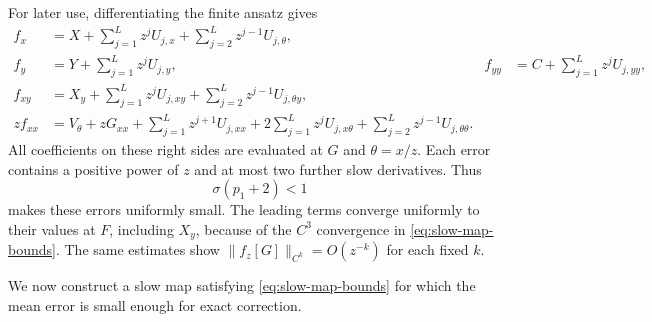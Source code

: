 For later use, differentiating the finite ansatz gives
\begin{align*}
 f_x&=X+\sum_{j=1}^L z^jU_{j,x}
           +\sum_{j=2}^L z^{j-1}U_{j,\theta},\\
 f_y&=Y+\sum_{j=1}^L z^jU_{j,y},
 &f_{yy}&=C+\sum_{j=1}^L z^jU_{j,yy},\\
 f_{xy}&=X_y+\sum_{j=1}^L z^jU_{j,xy}
           +\sum_{j=2}^L z^{j-1}U_{j,\theta y},\\
 zf_{xx}&=V_\theta+zG_{xx}
       +\sum_{j=1}^L z^{j+1}U_{j,xx}
       +2\sum_{j=1}^L z^jU_{j,x\theta}
       +\sum_{j=2}^L z^{j-1}U_{j,\theta\theta}.
\end{align*}
All coefficients on these right sides are evaluated at $G$ and
$\theta=x/z$.  Each error contains a positive power of $z$ and at most
two further slow derivatives.  Thus
\begin{equation}
 \sigma(p_1+2)<1
 \label{eq:fast-asymptotic-scale}
\end{equation}
makes these errors uniformly small.  The leading terms converge uniformly
to their values at $F$, including $X_y$, because of the $C^3$ convergence
in \eqref{eq:slow-map-bounds}.  The same estimates show
$\|f_z[G]\|_{C^k}=O(z^{-k})$ for each fixed $k$.

We now construct a slow map satisfying \eqref{eq:slow-map-bounds} for
which the mean error is small enough for exact correction.

